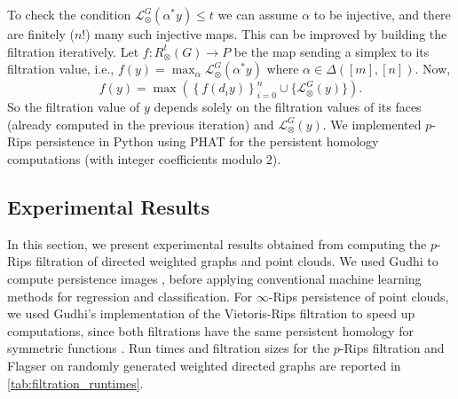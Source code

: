 \documentclass[a4paper,11pt]{article}
\theoremstyle{remark}
\begin{document}
To check the condition $\mathcal{L}^G_\otimes(\alpha^*y)\leq t$ we can assume $\alpha$ to be injective, and there are finitely ($n!$) many such injective maps. This can be improved by building the filtration iteratively. Let $f\colon R^t_\otimes(G)\to P$ be the map sending a simplex to its filtration value, i.e., $f(y)=\max_{\alpha}\mathcal{L}^G_\otimes(\alpha^*y)$ where $\alpha\in\Delta([m],[n])$. Now, 
\begin{equation*}
f(y) = \max\left(\left\{f(d_i y)\right\}_{i=0}^n\cup\{\mathcal{L}^G_\otimes(y)\} \right).
\end{equation*}
So the filtration value of $y$ depends solely on the filtration values of its faces (already computed in the previous iteration) and $\mathcal{L}^G_\otimes(y)$. We implemented $p$-Rips persistence in Python using PHAT \cite{bauer2017phat} for the persistent homology computations (with integer coefficients modulo $2$).

\subsection{Experimental Results}\label{subsec:experimental_results}
In this section, we present experimental results obtained from computing the $p$-Rips filtration of directed weighted graphs and point clouds. We used Gudhi \cite{gudhi:urm, gudhi:PersistenceRepresentations} to compute persistence images \cite{adams2017}, before applying conventional machine learning methods for regression and classification. For $\infty$-Rips persistence of point clouds, we used Gudhi's implementation of the Vietoris-Rips filtration \cite{gudhi:RipsComplex} to speed up computations, since both filtrations have the same persistent homology for symmetric functions \cite[p.~15]{turner2019rips}. Run times and filtration sizes for the $p$-Rips filtration and Flagser on randomly generated weighted directed graphs are reported in \cref{tab:filtration_runtimes}.
\end{document}
